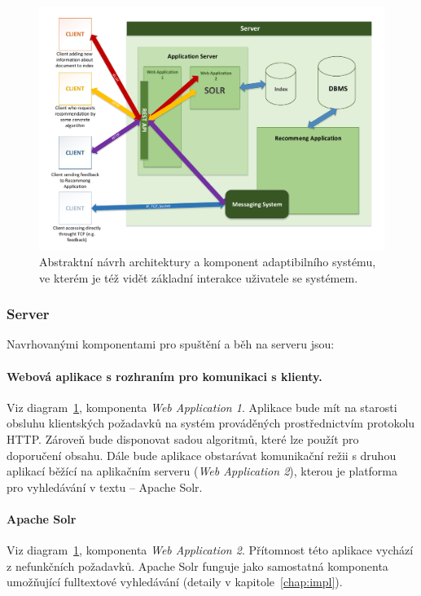 \documentclass[thesis=M,czech]{FITthesis}[2014/05/07]
\begin{document}
\begin{figure}\centering
	\includegraphics[width=1.0\textwidth]{obr/DIPLOMKA_env.pdf}
 	\caption[Abstraktní návrh architektury a komponent adaptibilního systému]{Abstraktní návrh architektury a komponent adaptibilního systému, ve kterém je též vidět základní interakce uživatele se systémem.}\label{fig:recommeng}
\end{figure}	

\subsubsection{Server}
Navrhovanými komponentami pro spuštění a běh na serveru jsou:

\paragraph{Webová aplikace s rozhraním pro komunikaci s klienty.}
	Viz diagram~\ref{fig:recommeng}, komponenta \emph{Web Application 1}. Aplikace bude mít na starosti obsluhu klientských požadavků na systém prováděných prostřednictvím protokolu HTTP. Zároveň bude disponovat sadou algoritmů, které lze použít pro doporučení obsahu. Dále bude aplikace obstarávat komunikační režii s druhou aplikací běžící na aplikačním serveru (\emph{Web Application 2}), kterou je platforma pro vyhledávání v textu – Apache Solr.

\paragraph{Apache Solr}
	Viz diagram~\ref{fig:recommeng}, komponenta \emph{Web Application 2}. Přítomnost této aplikace vychází z nefunkčních požadavků. Apache Solr funguje jako samostatná komponenta umožňující fulltextové vyhledávání (detaily v kapitole~\ref{chap:impl}).
\end{document}
